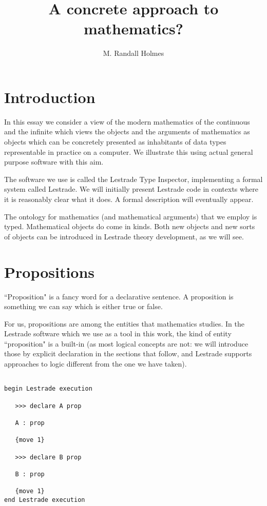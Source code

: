 \documentclass[12pt]{article}
\title{A concrete approach to mathematics?}
\author{M. Randall Holmes}
\begin{document}
\maketitle

\tableofcontents

\section{Introduction}

In this essay we consider a view of the modern mathematics of the continuous and the infinite which views the objects and the arguments of mathematics as objects which can be concretely presented as inhabitants of data types representable in practice on a computer.   We illustrate this using actual general purpose software with this aim.

The software we use is called the Lestrade Type Inspector, implementing a formal system called Lestrade.  We will initially present Lestrade code in contexts where it is reasonably clear what it does.  A formal description will eventually appear.

The ontology for mathematics (and mathematical arguments) that we employ is typed.  Mathematical objects do come in kinds.  Both new objects and new sorts of objects can be introduced in Lestrade theory development, as we will see.

\section{Propositions}

``Proposition" is a fancy word for a declarative sentence.  A proposition is something we can say which is either true or false.

For us, propositions are among the entities that mathematics studies.  In the Lestrade software which we use as a tool in this work, the kind of entity ``proposition" is a built-in (as most logical concepts are not:  we will introduce those by explicit declaration in the sections that follow, and Lestrade supports approaches to logic different from the one we have taken).

\begin{verbatim}

begin Lestrade execution

   >>> declare A prop

   A : prop

   {move 1}

   >>> declare B prop

   B : prop

   {move 1}
end Lestrade execution

\end{verbatim}
\end{document}
